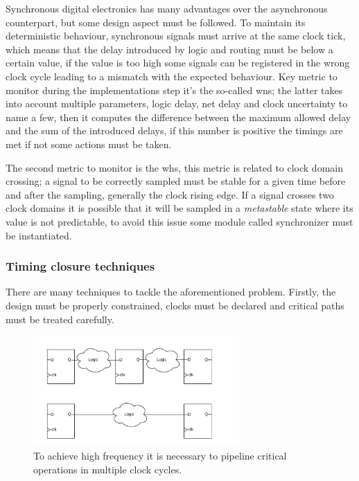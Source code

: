 \documentclass[../../main.tex]{subfiles}
\begin{document}
Synchronous digital electronics has many advantages over the asynchronous counterpart, but some design aspect must be followed. To maintain its deterministic behaviour, synchronous signals must arrive at the same clock tick, which means that the delay introduced by logic and routing must be below a certain value, if the value is too high some signals can be registered in the wrong clock cycle leading to a mismatch with the expected behaviour.
Key metric to monitor during the implementations step it's the so-called \acrfull{wns}; the latter takes into account multiple parameters, logic delay, net delay and  clock uncertainty to name a few, then it computes the difference between the maximum allowed delay and the sum of the introduced delays, if this number is positive the timings are met if not some actions must be taken.  
        
The second metric to monitor is the \acrfull{whs}, this metric is related to clock domain crossing; a signal to be correctly sampled must be stable for a given time before and after the sampling, generally  the clock rising edge. If a signal crosses two clock domains it is possible that it will be sampled in a \textit{metastable} state where its value is not predictable, to avoid this issue some module called synchronizer must be instantiated.  
        
\subsubsection{Timing closure techniques}

There are many techniques to tackle the aforementioned problem.  
Firstly, the design must be properly constrained, clocks must be declared and critical paths must be treated carefully. 

\begin{figure}[h]
    \centering
    \includegraphics[width=0.7\textwidth]{sections/04/Images/FF_piplineing.pdf}
    \caption{To achieve high frequency it is necessary to pipeline critical operations in multiple clock cycles.}
    \label{fig:FF_pipline}
\end{figure}
\end{document}
